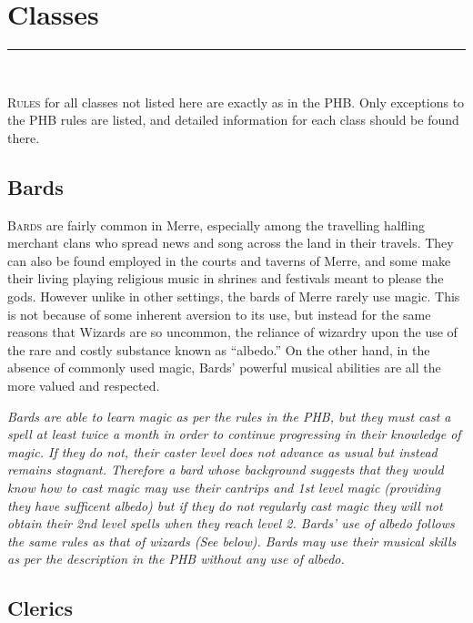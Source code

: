 \documentclass[paper=a4, fontsize=11pt]{scrartcl} %
\newcommand{\horrule}[1]{\rule{\linewidth}{#1}} %
\begin{document}
\section{Classes}

\horrule{0.5pt} \\[0.4cm] %

\begin{multicols}{2} %

\lettrine[lines=2]{\medievalsharp R}{ules} for all classes not listed here are exactly as in the PHB. Only exceptions to the PHB rules are listed, and detailed information for each class should be found there.

\subsection{Bards}

\lettrine[lines=2]{\medievalsharp B}{ards} are fairly common in Merre, especially among the travelling halfling merchant clans who spread news and song across the land in their travels. They can also be found employed in the courts and taverns of Merre, and some make their living playing religious music in shrines and festivals meant to please the gods. However unlike in other settings, the bards of Merre rarely use magic. This is not because of some inherent aversion to its use, but instead for the same reasons that Wizards are so uncommon, the reliance of wizardry upon the use of the rare and costly substance known as ``albedo.'' On the other hand, in the absence of commonly used magic, Bards' powerful musical abilities are all the more valued and respected. 

\textit{Bards are able to learn magic as per the rules in the PHB, but they must cast a spell at least twice a month in order to continue progressing in their knowledge of magic. If they do not, their caster level does not advance as usual but instead remains stagnant. Therefore a bard whose background suggests that they would know how to cast magic may use their cantrips and 1st level magic (providing they have sufficent albedo) but if they do not regularly cast magic they will not obtain their 2nd level spells when they reach level 2. Bards' use of albedo follows the same rules as that of wizards (See below). Bards may use their musical skills as per the description in the PHB without any use of albedo.}

\subsection{Clerics}


\end{multicols}
\end{document}
